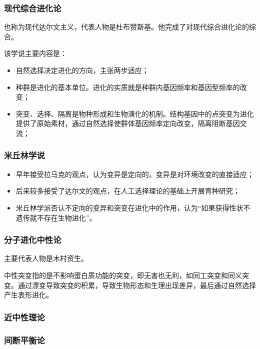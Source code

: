 \subsubsection{现代综合进化论}

也称为现代达尔文主义，代表人物是杜布赞斯基。他完成了对现代综合进化论的综合。

该学说主要内容是：

\begin{itemize}
	\item 自然选择决定进化的方向，主张两步适应；
	\item 种群是进化的基本单位。进化的实质就是种群内基因频率和基因型频率的改变；
	\item 突变、选择、隔离是物种形成和生物演化的机制。结构基因中的点突变为进化提供了原始素材，通过自然选择使群体基因频率定向改变，隔离阻断基因交流；
\end{itemize}

\subsubsection{米丘林学说}

\begin{itemize}
	\item 早年接受拉马克的观点，认为变异是定向的。变异是对环境改变的直接适应；
	\item 后来较多接受了达尔文的观点，在人工选择理论的基础上开展育种研究；
	\item 米丘林学派否认不定向的变异和突变在进化中的作用，认为“如果获得性状不遗传就不存在生物进化”。
\end{itemize}

\subsubsection{分子进化中性论}

主要代表人物是木村资生。

中性突变指的是不影响蛋白质功能的突变，即无害也无利，如同工突变和同义突变。通过漂变导致突变的积累，导致生物形态和生理出现差异，最后通过自然选择产生表形进化。

\subsubsection{近中性理论}


\subsubsection{间断平衡论}

